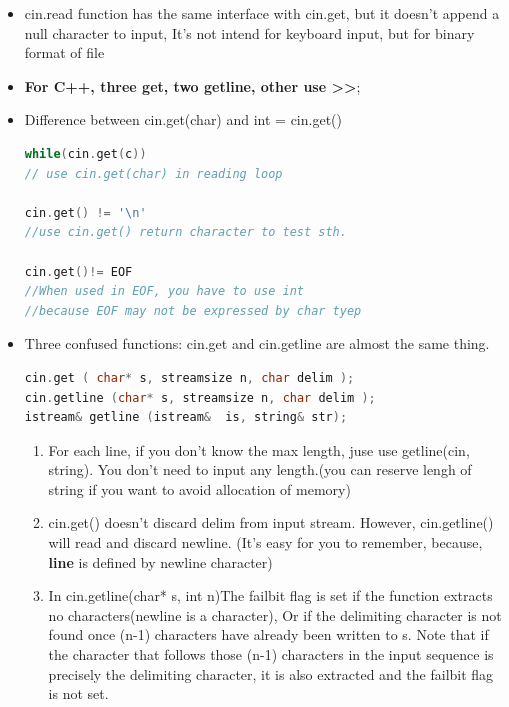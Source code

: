 \documentclass[a4paper,12pt,twoside]{book}
\begin{document}
\begin{itemize}
\begin{lstlisting}[frame=single, language=c++]
cin.getline(char * ,int n) //c++ read and discard newline
cin.get(char * ,int n) //not read newline
std::getline(istream&  is, string& str)
\end{lstlisting}

\item cin.read function has the same interface with cin.get, but it doesn't append a null character to input, It's not intend for keyboard input, but for binary format of file

\item \textbf{For C++, three get, two getline, other use >>};

\item Difference between cin.get(char) and int = cin.get()
\begin{lstlisting}[frame=single, language=c++]
while(cin.get(c))
// use cin.get(char) in reading loop

cin.get() != '\n'
//use cin.get() return character to test sth.

cin.get()!= EOF
//When used in EOF, you have to use int
//because EOF may not be expressed by char tyep
\end{lstlisting}

\item Three confused functions: cin.get and cin.getline are almost the same thing.
\begin{lstlisting}[frame=single, language=c++]
cin.get ( char* s, streamsize n, char delim );
cin.getline (char* s, streamsize n, char delim );
istream& getline (istream&  is, string& str);
\end{lstlisting}

\begin{enumerate}

\item For each line, if you don't know the max length, juse use getline(cin, string). You don't need to input any length.(you can reserve lengh of string if you want to avoid allocation of memory)

\item cin.get() doesn't discard delim from input stream. However, cin.getline() will read and discard newline.  (It's easy for you to remember, because, \textbf{line} is defined by newline character)

\item In cin.getline(char* s, int n)The failbit flag is set if the function extracts no characters(newline is a character), Or if the delimiting character is not found once (n-1) characters have already been written to s. Note that if the character that follows those (n-1) characters in the input sequence is precisely the delimiting character, it is also extracted and the failbit flag is not set.


\end{enumerate}
\end{itemize}
\end{document}
